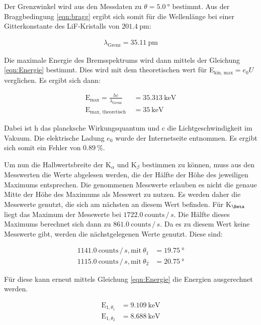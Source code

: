 Der Grenzwinkel wird aus den Messdaten zu $\theta = \SI{5.0}{\degree}$ bestimmt.
Aus der Braggbedingung \eqref{eqn:bragg} ergibt sich somit für die Wellenlänge bei einer Gitterkonstante des LiF-Kristalls von $\SI{201.4}{\pico\metre}$:

\begin{align*}
  \lambda_\text{Grenz} = \SI{35.11}{\pico\metre}
\end{align*}

Die maximale Energie des Bremsspektrums wird dann mittels der Gleichung \eqref{eqn:Energie} bestimmt.
Dies wird mit dem theoretischen wert für E$_\text{kin, max} = e_0 U$ verglichen.
Es ergibt sich dann:

\begin{align*}
  \text{E}_\text{max} = \frac{h c}{\lambda_\text{Grenz}} &= \SI{35.313}{\kilo\electronvolt} \\
  \text{E}_\text{max, theoretisch } &= \SI{35}{\kilo\electronvolt}
\end{align*}

Dabei ist h das plancksche Wirkungsquantum und c die Lichtgeschwindigkeit im Vakuum.
Die elektrische Ladung $e_0$ wurde der Internetseite \cite{e0} entnommen.
Es ergibt sich somit ein Fehler von $\SI{0.89}{\percent}$.

\FloatBarrier
Um nun die Halbwertsbreite der K$_\alpha$ und K$_\beta$ bestimmen zu können, muss aus den Messwerten die Werte abgelesen werden, die der Hälfte der Höhe des jeweiligen Maximums entsprechen.
Die genommenen Messwerte erlauben es nicht die genaue Mitte der Höhe des Maximums als Messwert zu nutzen.
Es werden daher die Messwerte genutzt, die sich am nächsten an diesem Wert befinden.
Für K$_\Beta$ liegt das Maximum der Messwerte bei $1722.0\ \text{counts} \, / \, s$.
Die Hälfte dieses Maximums berechnet sich dann zu  $861.0\ \text{counts} \, / \, s$.
Da es zu diesem Wert keine Messwerte gibt, werden die nächstgelegenen Werte genutzt.
Diese sind:

\begin{align*}
  1141.0\ \text{counts} \, / \, s, \text{mit}\ \theta_1 &= \SI{19.75}{\degree} \\
  1115.0\ \text{counts} \, / \, s, \text{mit}\ \theta_2 &= \SI{20.75}{\degree}
\end{align*}

Für diese kann erneut mittels Gleichung \eqref{eqn:Energie} die Energien ausgerechnet werden.

\begin{align*}
  \text{E}_{1, \theta_1} &= \SI{9.109}{\kilo\electronvolt} \\
  \text{E}_{1, \theta_2} &= \SI{8.688}{\kilo\electronvolt}
\end{align*}

